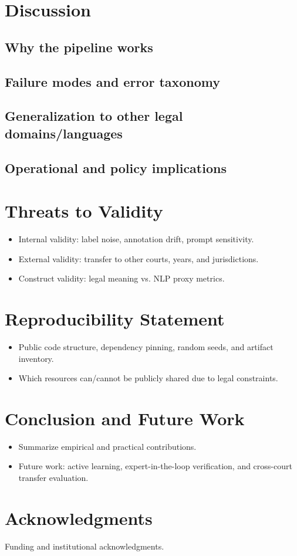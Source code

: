 \documentclass[preprint,a4paper,fleqn]{cas-dc}
\begin{document}
\section{Discussion}
\label{sec:discussion}
\subsection{Why the pipeline works}
\subsection{Failure modes and error taxonomy}
\subsection{Generalization to other legal domains/languages}
\subsection{Operational and policy implications}

\section{Threats to Validity}
\label{sec:validity}
\begin{itemize}
    \item Internal validity: label noise, annotation drift, prompt sensitivity.
    \item External validity: transfer to other courts, years, and jurisdictions.
    \item Construct validity: legal meaning vs. NLP proxy metrics.
\end{itemize}

\section{Reproducibility Statement}
\label{sec:reproducibility}
\begin{itemize}
    \item Public code structure, dependency pinning, random seeds, and artifact inventory.
    \item Which resources can/cannot be publicly shared due to legal constraints.
\end{itemize}

\section{Conclusion and Future Work}
\label{sec:conclusion}
\begin{itemize}
    \item Summarize empirical and practical contributions.
    \item Future work: active learning, expert-in-the-loop verification, and cross-court transfer evaluation.
\end{itemize}

\section*{Acknowledgments}
Funding and institutional acknowledgments.

\printcredits


\end{document}
